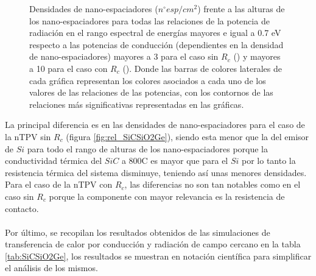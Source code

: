 \begin{figure}[H]
\begin{subfigure}[b]{0.49\textwidth}
		\caption{ }
		\label{fig:rel_SiCSiO2Ge_Rc}
	\end{subfigure}
	\caption{Densidades de nano-espaciadores ($n^{\circ}esp/cm^2$) frente a las alturas de los nano-espaciadores para todas las relaciones de la potencia de radiación en el rango espectral de energías mayores e igual a 0.7 eV respecto a las potencias de conducción (dependientes en la densidad de nano-espaciadores) mayores a 3 para el caso sin $R_c$ () y mayores a 10 para el caso con $R_c$ (). Donde las barras de colores laterales de cada gráfica representan los colores asociados a cada uno de los valores de las relaciones de las potencias, con los contornos de las relaciones más significativas representadas en las gráficas.}
	\label{fig:relation_SiCSiO2Ge}
\end{figure}
La principal diferencia es en las densidades de nano-espaciadores para el caso de la nTPV sin $R_c$ (figura \ref{fig:rel_SiCSiO2Ge}), siendo esta menor que la del emisor de $Si$ para todo el rango de alturas de los nano-espaciadores porque la conductividad térmica del $SiC$ a 800\textdegree C es mayor que para el $Si$ por lo tanto la resistencia térmica del sistema disminuye, teniendo así unas menores densidades. Para el caso de la nTPV con $R_c$, las diferencias no son tan notables como en el caso sin $R_c$ porque la componente con mayor relevancia es la resistencia de contacto.\\\\
Por último, se recopilan los resultados obtenidos de las simulaciones de transferencia de calor por conducción y radiación de campo cercano en la tabla \ref{tab:SiCSiO2Ge}, los resultados se muestran en notación científica para simplificar el análisis de los mismos.
